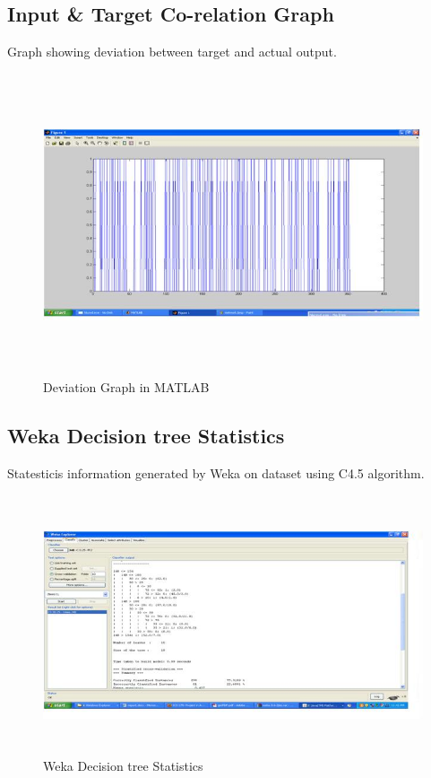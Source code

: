 \documentclass[a4paper,14pt,onecolumn]{article}
\begin{document}
\subsection{Input \& Target Co-relation Graph}
Graph showing deviation between target and actual output.
\begin{figure}[h!]
\begin{center}
\includegraphics[height=3.5in,width=5in]
{NNDev.jpg} 
\caption{Deviation Graph in MATLAB}
\end{center}
\end{figure}


\subsection{Weka Decision tree Statistics }
Statesticis information generated by Weka on dataset using C4.5 algorithm.
\begin{figure}[h!]
\begin{center}
\includegraphics[height=3in,width=5in]
{Wekatree.jpg} 
\caption{Weka Decision tree Statistics}
\end{center}
\end{figure}
\end{document}

